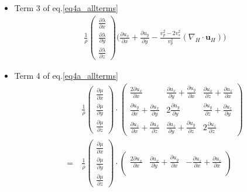 \documentclass{article}
\begin{document}
	\begin{itemize}
		\item Term 3 of eq.\eqref{eq4a_allterms}
		\begin{align}
			\frac{1}{\rho}
			\begin{pmatrix}
				\frac{\partial \lambda}{\partial x}\\
				\frac{\partial \lambda}{\partial y}\\
				\frac{\partial \lambda}{\partial z}
			\end{pmatrix}
			\bigg(\frac{\partial u_{x}}{\partial x} + \frac{\partial u_{y}}{\partial y} - \frac{v_{p}^{2} - 2v_{s}^{2}}{v_{p}^{2}} (\nabla_{H} \cdot \bm{u}_{H}) \bigg) 
		\end{align}
		
		\item Term 4  of eq.\eqref{eq4a_allterms}
		\begin{align}
			&\frac{1}{\rho} 
			\begin{pmatrix}
				\frac{\partial \mu}{\partial x}\\
				\frac{\partial \mu}{\partial y}\\
				\frac{\partial \mu}{\partial z}
			\end{pmatrix}
			\cdot 
			\begin{pmatrix}
				\frac{2\partial u_{x}}{\partial x} & \frac{\partial u_{x}}{\partial y}  + \frac{\partial u_{y}}{\partial x}& \frac{\partial u_{x}}{\partial z} + \frac{\partial u_{z}}{\partial x}\\
				\frac{\partial u_{y}}{\partial x} + \frac{\partial u_{x}}{\partial y}& 2\frac{\partial u_{y}}{\partial y} & \frac{\partial u_{y}}{\partial z} + \frac{\partial u_{z}}{\partial y}\\
				\frac{\partial u_{z}}{\partial x} + \frac{\partial u_{x}}{\partial z}& \frac{\partial u_{z}}{\partial y} + \frac{\partial u_{y}}{\partial z}& 2\frac{\partial u_{z}}{\partial z}
			\end{pmatrix} \\
			= \:
			&\frac{1}{\rho} 
			\begin{pmatrix}
				\frac{\partial \mu}{\partial x}\\
				\frac{\partial \mu}{\partial y}\\
				\frac{\partial \mu}{\partial z}
			\end{pmatrix}
			\cdot 
			\begin{pmatrix}
				\frac{2\partial u_{x}}{\partial x} & \frac{\partial u_{x}}{\partial y}  + \frac{\partial u_{y}}{\partial x}& -\frac{\partial u_{z}}{\partial x} + \frac{\partial u_{z}}{\partial x}\\

\end{pmatrix}
\end{align}
\end{itemize}
\end{document}
